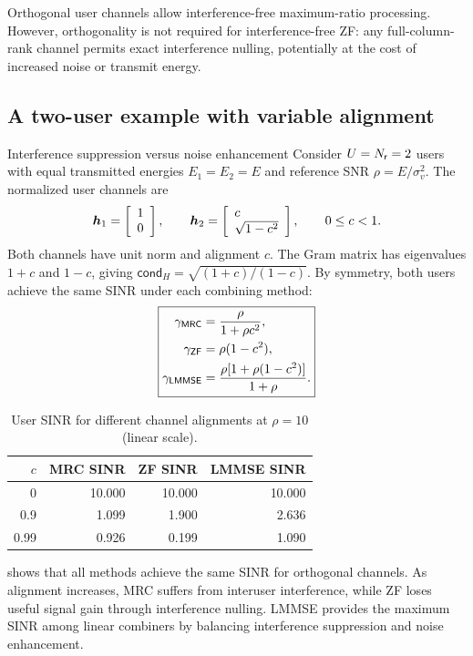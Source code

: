 Orthogonal user channels allow interference-free maximum-ratio processing. However, orthogonality is not required for interference-free ZF: any full-column-rank channel permits exact interference nulling, potentially at the cost of increased noise or transmit energy.

\subsection{A two-user example with variable alignment}
\begin{example}{Interference suppression versus noise enhancement}
	Consider $U=N_{\mathsf{r}}=2$ users with equal transmitted energies $E_1=E_2=E$ and reference SNR $\rho=E/\sigma_v^2$. The normalized user channels are
	\begin{equation}
		\bm{h}_1=\left[\begin{array}{l}1\\0\end{array}\right],
		\qquad
		\bm{h}_2=\left[\begin{array}{l}c\\\sqrt{1-c^2}\end{array}\right],
		\qquad 0\leq c<1.
		\label{eq:twochannels}
	\end{equation}
	Both channels have unit norm and alignment $c$. The Gram matrix has eigenvalues $1+c$ and $1-c$, giving $\mathsf{cond}_H=\sqrt{(1+c)/(1-c)}$. By symmetry, both users achieve the same SINR under each combining method:
	\begin{equation}
		\boxed{
			\begin{aligned}
				\gamma_{\mathsf{MRC}}&=\frac{\rho}{1+\rho c^2},\\
				\gamma_{\mathsf{ZF}}&=\rho(1-c^2),\\
				\gamma_{\mathsf{LMMSE}}&=\frac{\rho[1+\rho(1-c^2)]}{1+\rho}.
			\end{aligned}
		}
		\label{eq:twoSINR}
	\end{equation}
	
	\begin{table}[ht]
		\centering
		\caption{User SINR for different channel alignments at $\rho=10$ (linear scale).}
		\label{tab:two-user-sinr}
		\begin{tabular}{rrrr}
			\toprule
			$c$ & MRC SINR & ZF SINR & LMMSE SINR\\
			\midrule
			0 & 10.000 & 10.000 & 10.000\\
			0.9 & 1.099 & 1.900 & 2.636\\
			0.99 & 0.926 & 0.199 & 1.090\\
			\bottomrule
		\end{tabular}
	\end{table}
	 shows that all methods achieve the same SINR for orthogonal channels. As alignment increases, MRC suffers from interuser interference, while ZF loses useful signal gain through interference nulling. LMMSE provides the maximum SINR among linear combiners by balancing interference suppression and noise enhancement.
\end{example}

